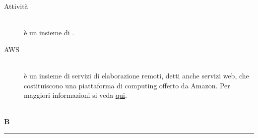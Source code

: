 \documentclass[12pt,a4paper]{article}
\begin{document}
\begin{description}
\item[Attività]
\hfill\\è un insieme di .

\item[AWS]
\hfill\\è un insieme di servizi di elaborazione remoti, detti anche servizi web, che costituiscono una piattaforma di computing offerto da Amazon. Per maggiori informazioni si veda \href{https://aws.amazon.com/it/}{qui}.
\end{description}

\newpage

\begin{center}
\hfill\\
	\LARGE \textbf{B}
\hfill\\
\rule[15pt]{30pt}{0.5pt}
\end{center}
\end{document}
